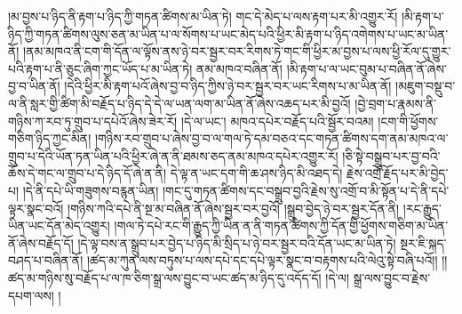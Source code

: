 །མ་བྱས་པ་ཉིད་ནི་རྟག་པ་ཉིད་ཀྱི་གཏན་ཚིགས་མ་ཡིན་ཏེ། གང་དེ་མེད་པ་ལས་རྟག་པར་མི་འགྱུར་རོ། །མི་རྟག་པ་ཉིད་ཀྱི་གཏན་ཚིགས་ལུས་ཅན་མ་ཡིན་པ་ལ་སོགས་པ་ཡང་མེད་པའི་ཕྱིར་མི་རྟག་པ་ཉིད་འགེགས་པ་ཡང་མ་ཡིན་ནོ། །ནམ་མཁའ་ནི་ངག་གི་དོན་ལ་ལྟོས་ནས་ཉེ་བར་སྦྱར་བར་རིགས་ཏེ་གང་གི་ཕྱིར་མ་བྱས་པ་ལས་ཕྱི་རོལ་དུ་གྱུར་པའི་རྟག་པ་ནི་ཅུང་ཞིག་ཀྱང་ཡོད་པ་མ་ཡིན་ཏེ། ནམ་མཁའ་བཞིན་ནོ། །མི་རྟག་པ་ལ་ཡང་བུམ་པ་བཞིན་ནོ་ཞེས་བྱ་བ་ཡིན་ནོ། །དེའི་ཕྱིར་མི་རྟག་པའོ་ཞེས་བྱ་བ་ཉིད་ཀྱིས་ཉེ་བར་སྦྱར་བར་ཡང་རིགས་པ་མ་ཡིན་ནོ། །མཇུག་བསྡུ་བ་ལ་ནི་སླར་གྱི་ཚིག་མི་བརྗོད་པ་ཉིད་དེ་དེ་ལ་ཡན་ལག་མ་ཡིན་ནོ་ཞེས་འཆད་པར་མི་བྱའོ། །བྱེ་བྲག་པ་རྣམས་ནི་གཉིས་ཀ་རབ་ཏུ་གྲུབ་པ་དཔེའོ་ཞེས་ཟེར་རོ། །དེ་ལ་ཡང་། མཁའ་དཔེར་བརྗོད་པའི་སྦྱོར་བའམ། །ངག་གི་ཕྱོགས་གཅིག་ཉིད་ཀྱང་མིན། །གཉིས་རབ་གྲུབ་པ་ཞེས་བྱ་བ་ལ་གལ་ཏེ་དམ་བཅའ་དང་གཏན་ཚིགས་དག་ནམ་མཁའ་ལ་གྲུབ་པ་དེའི་ཡོན་ཏན་ཡིན་པའི་ཕྱིར་ཞེ་ན་ནི་ཐམས་ཅད་ནམ་མཁའ་དཔེར་འགྱུར་རོ། །ཅི་སྟེ་བསྒྲུབ་པར་བྱ་བའི་ཆོས་དེ་གང་ལ་གྲུབ་པ་དེ་ཉིད་དོ་ཞེ་ན་ནི། དེ་ལྟ་ན་ཡང་དག་གི་ཆ་ཤས་ཉིད་མི་འཐད་དེ། རྗེས་འགྲོ་རྗོད་པར་མི་བྱེད་པ། །དེ་ནི་དཔེ་ཡི་གཟུགས་བརྙན་ཡིན། །གང་དུ་གཏན་ཚིགས་དང་བསྒྲུབ་བྱའི་རྗེས་སུ་འགྲོ་བ་མི་སྟོན་པ་དེ་ནི་དཔེ་ལྟར་སྣང་བའོ། །གཉིས་ཀའི་དཔེ་ནི་སྔ་མ་བཞིན་ནོ་ཞེས་སྦྱར་བར་བྱའོ། །སྒྲུབ་བྱེད་ཉེ་བར་སྦྱར་དོན་ནི། །རང་རྒྱུད་ཡིན་ཡང་དོན་མེད་འགྱུར། །གལ་ཏེ་དཔེ་རང་གི་རྒྱུད་ཀྱི་ཡིན་ན་ནི་གཏན་ཚིགས་ཀྱི་དོན་གྱི་ཕྱོགས་གཅིག་མ་ཡིན་ནོ་ཞེས་བརྗོད་དོ། །དེ་ལྟ་བས་ན་སྒྲུབ་པར་བྱེད་པ་ཉིད་མི་སྲིད་པ་ཉེ་བར་སྦྱར་བའི་དོན་ཡང་མ་ཡིན་ཏེ། སྔར་ཇི་སྐད་བཤད་པ་བཞིན་ནོ། །ཚད་མ་ཀུན་ལས་བཏུས་པ་ལས་དཔེ་དང་དཔེ་ལྟར་སྣང་བ་བརྟགས་པའི་ལེའུ་སྟེ་བཞི་པའོ།། །།ཚད་མ་གཉིས་སུ་བརྗོད་པ་ལ་ཁ་ཅིག་སྒྲ་ལས་བྱུང་བ་ཡང་ཚད་མ་ཉིད་དུ་འདོད་དོ། །དེ་ལ། སྒྲ་ལས་བྱུང་བ་རྗེས་དཔག་ལས། །
